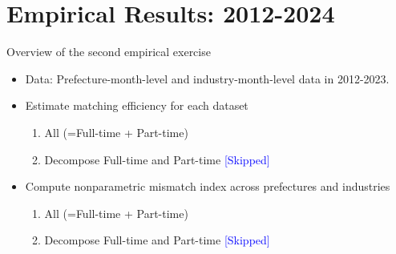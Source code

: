 \documentclass[aspectratio=169]{beamer}
\begin{document}
\section{Empirical Results: 2012-2024}

\begin{frame}{Overview of the second empirical exercise}
    \begin{itemize}
        \item Data: Prefecture-month-level and industry-month-level data in 2012-2023.
        \item Estimate matching efficiency for each dataset
        \begin{enumerate}
            \item All (=Full-time + Part-time)
            \item Decompose Full-time and Part-time \textcolor{blue}{[Skipped]}
        \end{enumerate}
        \item Compute nonparametric mismatch index across prefectures and industries
        \begin{enumerate}
            \item All (=Full-time + Part-time)
            \item Decompose Full-time and Part-time \textcolor{blue}{[Skipped]}
        \end{enumerate}
    \end{itemize}
\end{frame}
\end{document}

